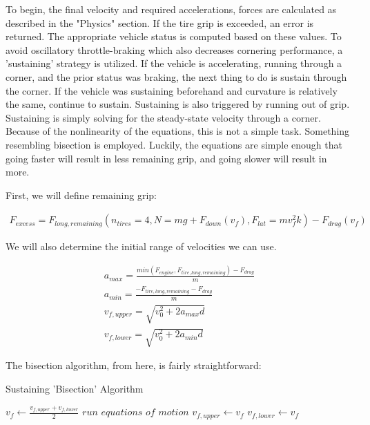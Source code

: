 \documentclass{article}
\begin{document}
To begin, the final velocity and required accelerations, forces are calculated as described in the "Physics" section. If the tire grip is exceeded, an error is returned. The appropriate vehicle status is computed based on these values. To avoid oscillatory throttle-braking which also decreases cornering performance, a 'sustaining' strategy is utilized. If the vehicle is accelerating, running through a corner, and the prior status was braking, the next thing to do is sustain through the corner. If the vehicle was sustaining beforehand and curvature is relatively the same, continue to sustain. Sustaining is also triggered by running out of grip. Sustaining is simply solving for the steady-state velocity through a corner. Because of the nonlinearity of the equations, this is not a simple task. Something resembling bisection is employed. Luckily, the equations are simple enough that going faster will result in less remaining grip, and going slower will result in more.

First, we will define remaining grip:

\begin{align}
	F_{excess} = F_{long,remaining}(n_{tires} = 4, N = m g + F_{down}(v_f), F_{lat} = m v_f^2 k) - F_{drag}(v_f)
\end{align}

We will also determine the initial range of velocities we can use.

\begin{align}
	a_{max} = \frac{min(F_{engine},F_{tire,long,remaining})-F_{drag}}{m} \\
	a_{min} = \frac{-F_{tire,long,remaining}-F_{drag}}{m} \\
	v_{f,upper} = \sqrt{v_0^2 + 2 a_{max} d} \\
	v_{f,lower} = \sqrt{v_0^2 + 2 a_{min} d}
\end{align}

The bisection algorithm, from here, is fairly straightforward:

\begin{algorithm}[H]
\caption{Sustaining 'Bisection' Algorithm}
\begin{algorithmic}[1]
		\State $v_f \gets \frac{v_{f,upper}+v_{f,lower}}{2}$
		\State $run$ $equations$ $of$ $motion$
			\State $v_{f,upper} \gets v_{f}$
		\Else
			\State $v_{f,lower} \gets v_{f}$
		\EndIf
	\EndWhile
\end{algorithmic}
\end{algorithm}
\end{document}
